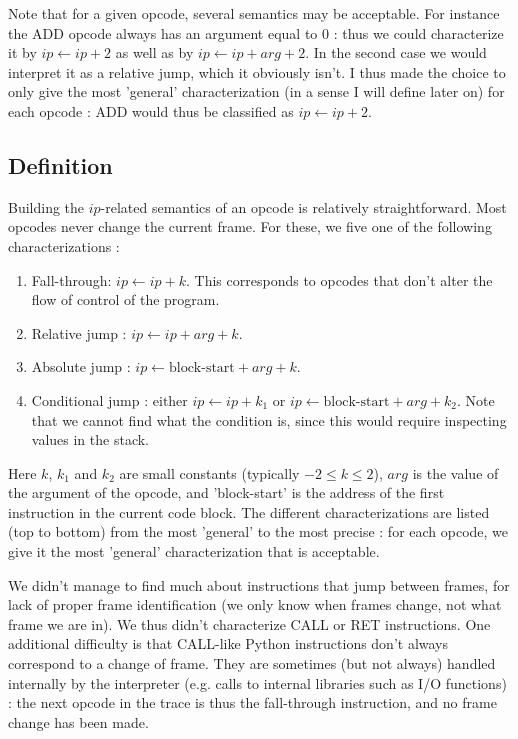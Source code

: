 \documentclass[english]{article}
\begin{document}
Note that for a given opcode, several semantics may be acceptable. For instance the ADD opcode always has an argument equal to $0$ : thus we could characterize it by $ip \leftarrow ip + 2$ as well as by $ip \leftarrow ip + arg + 2$. In the second case we would interpret it as a relative jump, which it obviously isn't. I thus made the choice to only give the most 'general' characterization (in a sense I will define later on) for each opcode : ADD would thus be classified as $ip \leftarrow ip + 2$.

\subsection{Definition}

Building the $ip$-related semantics of an opcode is relatively straightforward. Most opcodes never change the current frame. For these, we five one of the following characterizations :
\begin{enumerate}
	\item Fall-through: $ip \leftarrow ip + k$. This corresponds to opcodes that don't alter the flow of control of the program.
	\item Relative jump : $ip \leftarrow ip + arg + k$.
	\item Absolute jump : $ip \leftarrow \textrm{block-start} + arg + k$.
	\item Conditional jump : $\textrm{either } ip \leftarrow ip + k_1 \textrm{ or } ip \leftarrow \textrm{block-start} + arg + k_2$. Note that we cannot find what the condition is, since this would require inspecting values in the stack.
\end{enumerate}
Here $k$, $k_1$ and $k_2$ are small constants (typically $-2 \leq k \leq 2$), $arg$ is the value of the argument of the opcode, and 'block-start' is the address of the first instruction in the current code block. 
The different characterizations are listed (top to bottom) from the most 'general' to the most precise : for each opcode, we give it the most 'general' characterization that is acceptable.

We didn't manage to find much about instructions that jump between frames, for lack of proper frame identification (we only know when frames change, not what frame we are in). We thus didn't characterize CALL or RET instructions. One additional difficulty is that CALL-like Python instructions don't always correspond to a change of frame. They are sometimes (but not always) handled internally by the interpreter (e.g. calls to internal libraries such as I/O functions) : the next opcode in the trace is thus the fall-through instruction, and no frame change has been made.
\end{document}
